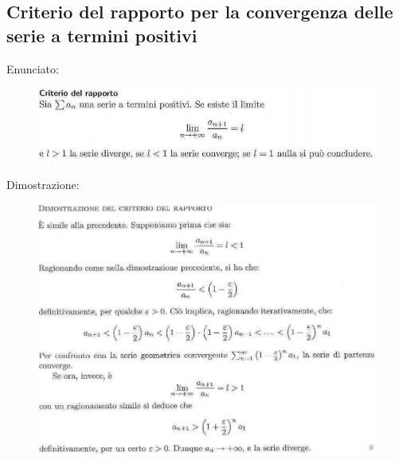 \documentclass[a4paper, 9pt]{report}
\begin{document}
\subsection*{Criterio del rapporto per la convergenza delle serie a termini positivi}
Enunciato:\begin{figure}[h!]
    \includegraphics[width=\linewidth]{../dim/rapporto1.PNG}
\end{figure}
\newline
Dimostrazione:\begin{figure}[h!]
    \includegraphics[width=\linewidth]{../dim/rapporto2.PNG}
\end{figure}
\newpage
\end{document}
